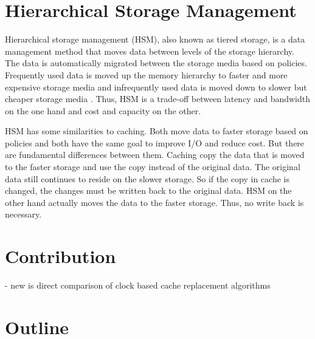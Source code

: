 \documentclass[
	12pt,
	a4paper,
	abstract,
	bibliography=totoc,
	chapterprefix,
	headings=openright,
	numbers=endperiod,
	parskip=half,
	twoside,
]{scrreprt}
\begin{document}


\section{Hierarchical Storage Management}


Hierarchical storage management (HSM), also known as tiered storage, is a data management method that moves data between levels of the storage hierarchy.
The data is automatically migrated between the storage media based on policies.
Frequently used data is moved up the memory hierarchy to faster and more expensive 
storage media and infrequently used data is moved down to slower but cheaper storage media
 \cite{lugar2001hierarchical}.
Thus, HSM is a trade-off between latency and bandwidth on the one hand 
and cost and capacity on the other.

HSM has some similarities to caching.
Both move data to faster storage based on policies and both have the same goal to improve I/O 
and reduce cost.
But there are fundamental differences between them.
Caching copy the data that is moved to the faster storage and use the copy instead of the original data. 
The original data still continues to reside on the slower storage.
So if the copy in cache is changed, the changes must be written back to the original data.
HSM on the other hand actually moves the data to the faster storage.
Thus, no write back is necessary.

\section{Contribution}
- new is direct comparison of clock based cache replacement algorithms\\

\section{Outline}

\end{document}
